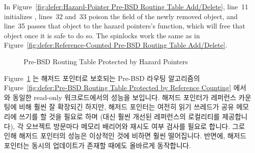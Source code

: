 In
Figure~\ref{fig:defer:Hazard-Pointer Pre-BSD Routing Table Add/Delete},
line~11 initializes ,
lines~32 and~33 poison the  field of the newly removed
object, and
line~35 passes that object to the hazard pointers's
 function, which will free that object once it
is safe to do so.
The spinlocks work the same as in
Figure~\ref{fig:defer:Reference-Counted Pre-BSD Routing Table Add/Delete}.
\fi

\begin{figure}[tb]
\centering
{}
\caption{Pre-BSD Routing Table Protected by Hazard Pointers}
\label{fig:defer:Pre-BSD Routing Table Protected by Hazard Pointers}
\end{figure}

Figure~\ref{fig:defer:Pre-BSD Routing Table Protected by Hazard Pointers} 는
해저드 포인터로 보호되는 Pre-BSD 라우팅 알고리즘의
Figure~\ref{fig:defer:Pre-BSD Routing Table Protected by Reference Counting}
에서와 동일한 read-only 워크로드에서의 성능을 보입니다.
해저드 포인터가 레퍼런스 카운팅에 비해 훨씬 잘 확장되긴 하지만, 해저드 포인터는
여전히 읽기 쓰레드가 공유 메모리에 쓰기를 할 것을 필요로 하며 (대신 훨씬 개선된
레퍼런스의 로컬리티를 제공합니다), 각 오브젝트 방문마다 메모리 배리어와 재시도
여부 검사를 필요로 합니다.
그로 인해 해저드 포인터의 성능은 이상적인 것에 비하면 훨씬 떨어집니다.
반면에, 해저드 포인터는 동시의 업데이트가 존재할 때에도 올바르게 동작합니다.
\iffalse

